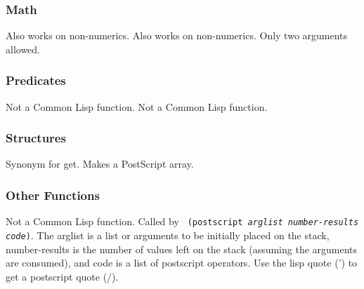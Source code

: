 \subsubsection{Math}
\begin{list} %
{} {\setlength{\itemsep}{0in}\setlength{\labelwidth}{0.5in}
\setlength{\labelsep}{0in}
\setlength{\leftmargin}{0.5in}}
\com{+} {}
\com{-} {}
\com{*} {}
\com{/} {}
\com{$=$} {Also works on non-numerics.}
\com{$/=$} {Also works on non-numerics.  Only two arguments allowed.}
\com{$>$} {}
\com{$<$} {}
\com{$>=$} {}
\com{$>=$} {}
 {}
 {}
 {}
 {}
\end{list}

\subsubsection{Predicates}
\begin{list} %
{} {\setlength{\itemsep}{0in}\setlength{\labelwidth}{1in}
\setlength{\labelsep}{0in}
\setlength{\leftmargin}{1in}}
 {}
 {Not a Common Lisp function.}
 {}
 {Not a Common Lisp function.}
 {}
 {}
 {}
 {}
 {}
\end{list}

\subsubsection{Structures}
\begin{list} %
{} {\setlength{\itemsep}{0in}\setlength{\labelwidth}{1in}
\setlength{\labelsep}{0in}
\setlength{\leftmargin}{1in}}
 {Synonym for get.}
 {Makes a PostScript array.}
\end{list}

\subsubsection{Other Functions}
\begin{list} %
{} {\setlength{\itemsep}{0in}\setlength{\labelwidth}{1.1in}
\setlength{\labelsep}{0in}
\setlength{\leftmargin}{1.1in}}
 {Not a Common Lisp function.  Called by {\tt
(postscript {\it arglist number-results code})}.  The arglist is a
list or arguments to be initially  
placed on the stack, number-results is the number of values left on the stack
(assuming the arguments are consumed), and code is a list of postscript
operators.  Use the lisp quote (') to get a postscript quote (/).}
 {}
 {}
\end{list}

